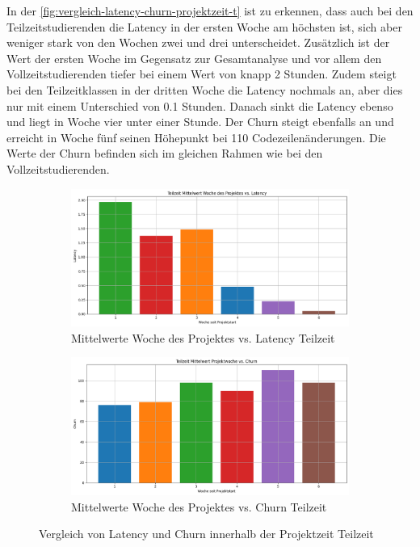 In der \autoref{fig:vergleich-latency-churn-projektzeit-t} ist zu erkennen, dass auch bei den Teilzeitstudierenden die Latency in der ersten Woche am höchsten ist, sich aber weniger stark von den Wochen zwei und drei unterscheidet. Zusätzlich ist der Wert der ersten Woche im Gegensatz zur Gesamtanalyse und vor allem den Vollzeitstudierenden tiefer bei einem Wert von knapp 2 Stunden. Zudem steigt bei den Teilzeitklassen in der dritten Woche die Latency nochmals an, aber dies nur mit einem Unterschied von 0.1 Stunden. Danach sinkt die Latency ebenso und liegt in Woche vier unter einer Stunde. Der Churn steigt ebenfalls an und erreicht in Woche fünf seinen Höhepunkt bei 110 Codezeilenänderungen. Die Werte der Churn befinden sich im gleichen Rahmen wie bei den Vollzeitstudierenden.

\begin{figure}[htbp]
    \centering
    \begin{subfigure}[b]{0.48\textwidth}
        \centering
        \includegraphics[width=\textwidth]{Figures/mittelwert-woche-lateny-t.png}
        \caption{Mittelwerte Woche des Projektes vs. Latency Teilzeit}
        \label{fig:mittelwert-woche-lateny-t}
    \end{subfigure}
    \hfill
    \begin{subfigure}[b]{0.48\textwidth}
        \centering
        \includegraphics[width=\textwidth]{Figures/mittelwert-woche-churn-t.png}
        \caption{Mittelwerte Woche des Projektes vs. Churn Teilzeit}
        \label{fig:mittelwert-woche-churn-t}
    \end{subfigure}
    \caption{Vergleich von Latency und Churn innerhalb der Projektzeit Teilzeit}
    \label{fig:vergleich-latency-churn-projektzeit-t}
\end{figure}

